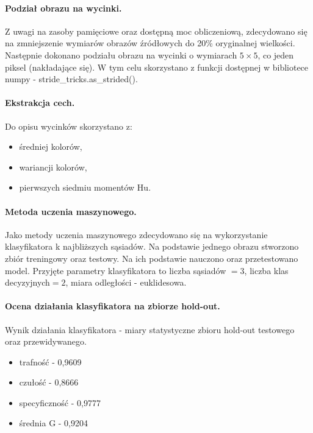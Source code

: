 \documentclass[a4paper, 11pt]{article}
\begin{document}
\paragraph{Podział obrazu na wycinki.}


Z uwagi na zasoby pamięciowe oraz dostępną moc obliczeniową, zdecydowano się na zmniejszenie wymiarów obrazów źródłowych do 20\% oryginalnej wielkości. Następnie dokonano podziału obrazu na wycinki o wymiarach $5\times5$, co jeden piksel (nakładające się). W tym celu skorzystano z funkcji dostępnej w bibliotece numpy - stride\_tricks.as\_strided().
\paragraph{Ekstrakcja cech.}

Do opisu wycinków skorzystano z:
\begin{itemize}
	\item średniej kolorów,
	\item wariancji kolorów,
	\item pierwszych siedmiu momentów Hu.
\end{itemize}
\paragraph{Metoda uczenia maszynowego.}

Jako metody uczenia maszynowego zdecydowano się na wykorzystanie klasyfikatora k najbliższych sąsiadów. Na podstawie jednego obrazu stworzono zbiór treningowy oraz testowy. Na ich podstawie nauczono oraz przetestowano model. Przyjęte parametry klasyfikatora to liczba sąsiadów $= 3$, liczba klas decyzyjnych$ = 2$, miara odległości - euklidesowa.

\paragraph{Ocena działania klasyfikatora na zbiorze hold-out.}

Wynik działania klasyfikatora - miary statystyczne zbioru hold-out testowego oraz przewidywanego.

\begin{itemize}
	\item trafność - 0,9609
	\item czułość - 0,8666
	\item specyficzność - 0,9777
	\item średnia G - 0,9204
\end{itemize}
\end{document}
